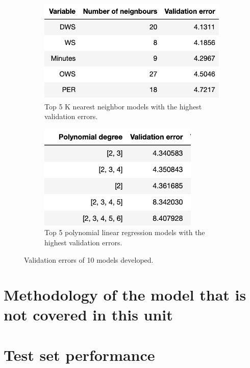 \documentclass[letterpaper,12pt,twoside,]{pinp}
\begin{document}
\begin{figure}[H]
\begin{subfigure}{0.5\textwidth}
\includegraphics[width=0.9\linewidth, height=5cm]{knn_models.png} 
\caption{Top 5 K nearest neighbor models with the highest validation errors.}
\label{fig:subim1}
\end{subfigure}
\begin{subfigure}{0.5\textwidth}
\includegraphics[width=0.9\linewidth, height=5cm]{poly_models.png}
\caption{Top 5 polynomial linear regression models with the highest validation errors.}
\label{fig:subim2}
\end{subfigure}
\caption{Validation errors of 10 models developed.}
\end{figure}

\hypertarget{methodology-of-the-model-that-is-not-covered-in-this-unit}{%
\section{Methodology of the model that is not covered in this
unit}\label{methodology-of-the-model-that-is-not-covered-in-this-unit}}

\hypertarget{test-set-performance}{%
\section{Test set performance}\label{test-set-performance}}



\renewcommand\refname{Analysis and conclusions}


\end{document}

